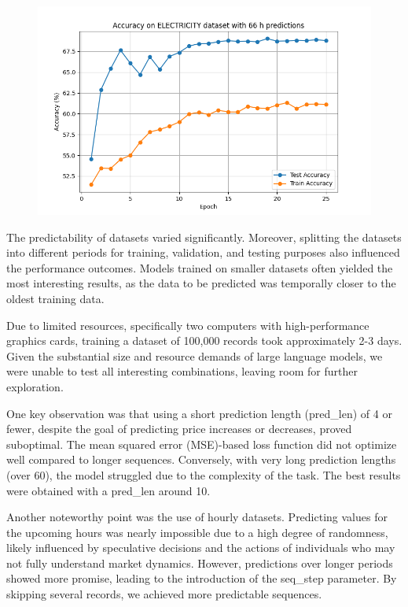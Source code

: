 \begin{figure}[h!]

  \centering

	\includegraphics[width=\linewidth]{"pictures/electricity_66h_results.png"} 
	\caption{}

	\label{fig:electricity_fig}

\end{figure}

\FloatBarrier


The predictability of datasets varied significantly. Moreover, splitting the datasets into different periods for training, validation, and testing purposes also influenced the performance outcomes. Models trained on smaller datasets often yielded the most interesting results, as the data to be predicted was temporally closer to the oldest training data.

Due to limited resources, specifically two computers with high-performance graphics cards, training a dataset of 100,000 records took approximately 2-3 days. Given the substantial size and resource demands of large language models, we were unable to test all interesting combinations, leaving room for further exploration.

One key observation was that using a short prediction length (pred\_len) of 4 or fewer, despite the goal of predicting price increases or decreases, proved suboptimal. The mean squared error (MSE)-based loss function did not optimize well compared to longer sequences. Conversely, with very long prediction lengths (over 60), the model struggled due to the complexity of the task. The best results were obtained with a pred\_len around 10.

Another noteworthy point was the use of hourly datasets. Predicting values for the upcoming hours was nearly impossible due to a high degree of randomness, likely influenced by speculative decisions and the actions of individuals who may not fully understand market dynamics. However, predictions over longer periods showed more promise, leading to the introduction of the seq\_step parameter. By skipping several records, we achieved more predictable sequences.

